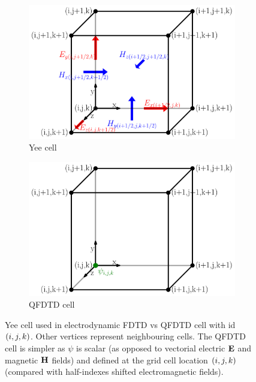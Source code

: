\begin{figure}
 \centering
    \begin{subfigure}{0.48\columnwidth}
        \centering
        \includegraphics[width=\textwidth]{figures/fdtd_cell_yee}
        \caption{Yee cell}
        \label{fig:qfdtd:cell:yee}
    \end{subfigure}
    \begin{subfigure}{0.48\columnwidth}
        \centering
        \includegraphics[width=\textwidth]{figures/fdtd_cell_qfdtd}
        \caption{QFDTD cell}
        \label{fig:qfdtd:cell:qfdtd}
    \end{subfigure}
        \caption{\label{fig:qfdtd:cell}Yee cell used in electrodynamic FDTD vs QFDTD
        cell with id $\left( i,j,k \right)$. Other vertices represent neighbouring cells.
        The QFDTD cell is simpler as $\psi$ is scalar (as opposed to vectorial
        electric $\textbf{E}$ and magnetic $\textbf{H}$ fields) and defined at the grid cell
        location $\left( i,j,k \right)$ (compared with half-indexes shifted
        electromagnetic fields).}
\end{figure}



